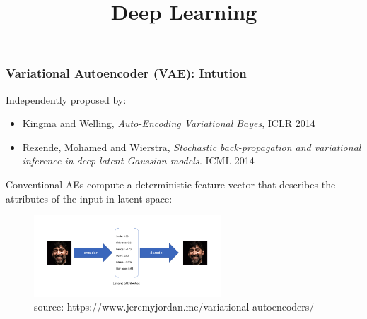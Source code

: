




\title{Deep Learning}

\date{}



\newcommand{\titlefigure}{plots/frontpage.png}

\newcommand{\learninggoals}{
  \item intution
  \item VAE-parameter fitting
  \item ereparametrization trick
}





\begin{frame}
\frametitle{Variational Autoencoder (VAE): Intution}

    
 Independently proposed by:
\small{
\begin{itemize}
\item Kingma and Welling, \emph{Auto-Encoding Variational Bayes}, ICLR 2014
\item Rezende, Mohamed and Wierstra, \emph{Stochastic back-propagation and variational inference in deep latent Gaussian models.} ICML 2014
\end{itemize}}

\vspace{1mm}

Conventional AEs compute a deterministic feature vector that describes the attributes of the input in latent space:

                \begin{figure}
                \centering
                \includegraphics[width=7cm]{plots/ae_intution.png}
                \vspace{-8pt}
                \caption{\tiny{source: https://www.jeremyjordan.me/variational-autoencoders/}}
                \end{figure}
    
\end{frame}

